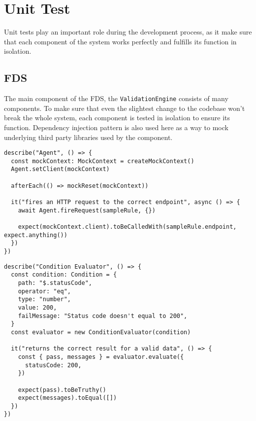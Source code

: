 \section{Unit Test}

  Unit tests play an important role during the development process, as it make sure that each component of the system works perfectly and fulfills its function in isolation.

  \subsection{FDS}

    The main component of the FDS, the \verb;ValidationEngine; consists of many components. To make sure that even the slightest change to the codebase won't break the whole system, each component is tested in isolation to ensure its function. Dependency injection pattern is also used here as a way to mock underlying third party libraries used by the component. 

    \begin{lstlisting}[style=es6, caption={Dependency injection usage in a unit test within FDS project (TypeScript)}]
describe("Agent", () => {
  const mockContext: MockContext = createMockContext()
  Agent.setClient(mockContext)

  afterEach(() => mockReset(mockContext))

  it("fires an HTTP request to the correct endpoint", async () => {
    await Agent.fireRequest(sampleRule, {})

    expect(mockContext.client).toBeCalledWith(sampleRule.endpoint, expect.anything())
  })
})
    \end{lstlisting}

    \newpage
    \begin{lstlisting}[style=es6, caption={Example unit test of the condition evaluator (TypeScript)}]
describe("Condition Evaluator", () => {
  const condition: Condition = {
    path: "$.statusCode",
    operator: "eq",
    type: "number",
    value: 200,
    failMessage: "Status code doesn't equal to 200",
  }
  const evaluator = new ConditionEvaluator(condition)

  it("returns the correct result for a valid data", () => {
    const { pass, messages } = evaluator.evaluate({
      statusCode: 200,
    })

    expect(pass).toBeTruthy()
    expect(messages).toEqual([])
  })
})
    \end{lstlisting}


